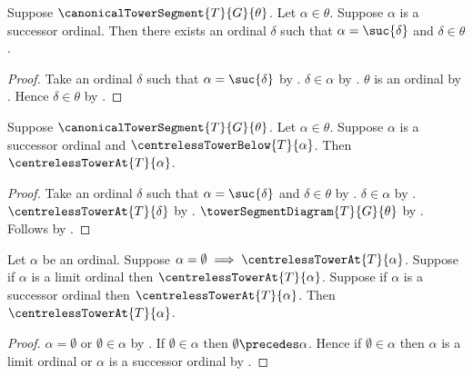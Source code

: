 \begin{proposition}\label{canonical_tower_successor_predecessor_context}
    Suppose $\canonicalTowerSegment{T}{G}{\theta}$.
    Let $\alpha\in\theta$.
    Suppose $\alpha$ is a successor ordinal.
    Then there exists an ordinal $\delta$ such that
        $\alpha=\suc{\delta}$ and $\delta\in\theta$.
\end{proposition}
\begin{proof}
    Take an ordinal $\delta$ such that $\alpha=\suc{\delta}$ by
        .
    $\delta\in\alpha$ by .
    $\theta$ is an ordinal by
        .
    Hence $\delta\in\theta$ by .
\end{proof}

\begin{proposition}\label{canonical_centreless_tower_successor_from_below}
    Suppose $\canonicalTowerSegment{T}{G}{\theta}$.
    Let $\alpha\in\theta$.
    Suppose $\alpha$ is a successor ordinal and
        $\centrelessTowerBelow{T}{\alpha}$.
    Then $\centrelessTowerAt{T}{\alpha}$.
\end{proposition}
\begin{proof}
    Take an ordinal $\delta$ such that
        $\alpha=\suc{\delta}$ and $\delta\in\theta$ by
        .
    $\delta\in\alpha$ by .
    $\centrelessTowerAt{T}{\delta}$ by
        .
    $\towerSegmentDiagram{T}{G}{\theta}$ by
        .
    Follows by .
\end{proof}

\begin{proposition}\label{centreless_tower_at_from_ordinal_cases}
    Let $\alpha$ be an ordinal.
    Suppose $\alpha=\emptyset\implies
        \centrelessTowerAt{T}{\alpha}$.
    Suppose if $\alpha$ is a limit ordinal then
        $\centrelessTowerAt{T}{\alpha}$.
    Suppose if $\alpha$ is a successor ordinal then
        $\centrelessTowerAt{T}{\alpha}$.
    Then $\centrelessTowerAt{T}{\alpha}$.
\end{proposition}
\begin{proof}
    $\alpha=\emptyset$ or $\emptyset\in\alpha$ by
        .
    If $\emptyset\in\alpha$ then
        $\emptyset\precedes\alpha$.
    Hence if $\emptyset\in\alpha$ then
        $\alpha$ is a limit ordinal or
        $\alpha$ is a successor ordinal by
        .
\end{proof}

